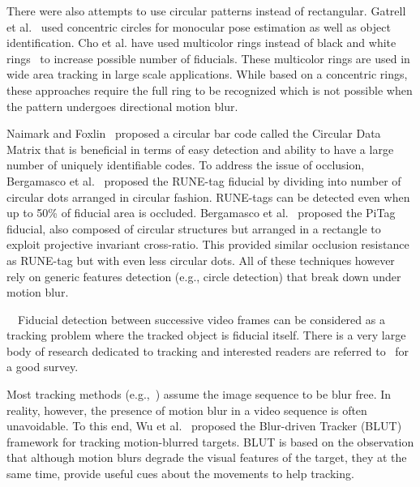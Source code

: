 \documentclass[runningheads]{llncs}
\begin{document}
There were also attempts to use circular patterns instead of rectangular.
Gatrell et al.~\cite{concentric} used concentric circles
for monocular pose estimation as well as object identification. Cho et al.
\cite{Cho:2001,Cho97fastcolor} have used multicolor rings instead of black and white rings~\cite{concentric} to increase possible number of fiducials.
These multicolor rings are used in wide area tracking in large scale
applications.  While based on a concentric rings, these approaches require
the full ring to be recognized which is not possible when the pattern undergoes directional
motion blur.

Naimark and Foxlin~\cite{NaimarkF02} proposed a circular bar code
called the Circular Data Matrix that is beneficial in terms of
easy detection and ability to have a large number
of uniquely identifiable codes.  To address the issue of occlusion,
Bergamasco et al.~\cite{runetag11} proposed the RUNE-tag fiducial by dividing
into number of circular dots arranged in circular fashion. RUNE-tags can be
detected even when up to 50\% of fiducial area is occluded. Bergamasco et
al.~\cite{Pitag13} proposed the PiTag fiducial, also composed of circular
structures but arranged in a rectangle to exploit projective invariant cross-ratio.
This provided similar occlusion resistance as RUNE-tag but with even less
circular dots. All of these techniques however rely on generic features
detection (e.g., circle detection) that break down under motion blur.


~~Fiducial detection between successive video
frames can be considered as a tracking problem where the tracked object is
fiducial itself.  There is a very large body of research dedicated to tracking and interested
readers are referred to~\cite{Yilmaz:2006} for a good survey.

Most tracking methods (e.g.,~\cite{Ross:2008,Wu:2009,Perez02,Mei:2009}) assume
the image sequence to be blur free. In reality, however, the presence of motion blur in 
a video sequence is often unavoidable. To this end, Wu et al.~\cite{Wu:2011}
proposed the Blur-driven Tracker (BLUT) framework for tracking motion-blurred targets. BLUT
is based on the observation that although motion blurs degrade the visual
features of the target, they at the same time, provide useful cues about the
movements to help tracking.
\end{document}
